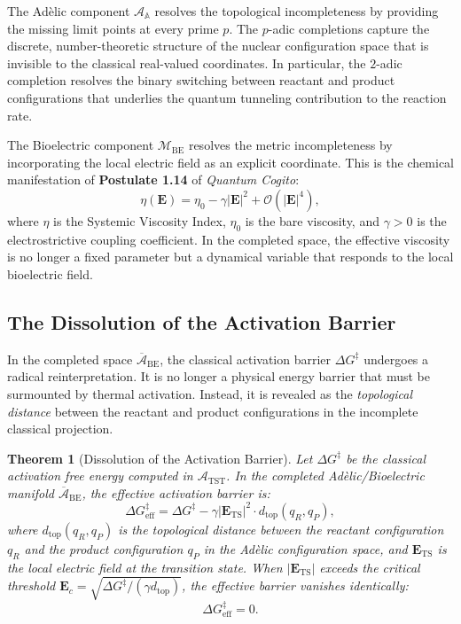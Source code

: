 \documentclass[11pt,openany]{extbook}
\theoremstyle{plain}
\newtheorem{theorem}{Theorem}[chapter]
\theoremstyle{definition}
\begin{document}
\noindent The Adèlic component $\mathcal{A}_{\mathbb{A}}$ resolves the topological incompleteness by providing the missing limit points at every prime $p$. The $p$-adic completions capture the discrete, number-theoretic structure of the nuclear configuration space that is invisible to the classical real-valued coordinates. In particular, the $2$-adic completion resolves the binary switching between reactant and product configurations that underlies the quantum tunneling contribution to the reaction rate.

\noindent The Bioelectric component $\mathcal{M}_{\mathrm{BE}}$ resolves the metric incompleteness by incorporating the local electric field as an explicit coordinate. This is the chemical manifestation of \textbf{Postulate 1.14} of \emph{Quantum Cogito}:
\[
\eta(\mathbf{E}) = \eta_0 - \gamma|\mathbf{E}|^2 + \mathcal{O}(|\mathbf{E}|^4),
\]
where $\eta$ is the Systemic Viscosity Index, $\eta_0$ is the bare viscosity, and $\gamma > 0$ is the electrostrictive coupling coefficient. In the completed space, the effective viscosity is no longer a fixed parameter but a dynamical variable that responds to the local bioelectric field.

\subsection{The Dissolution of the Activation Barrier}

\noindent In the completed space $\overline{\mathcal{A}}_{\mathrm{BE}}$, the classical activation barrier $\Delta G^{\ddagger}$ undergoes a radical reinterpretation. It is no longer a physical energy barrier that must be surmounted by thermal activation. Instead, it is revealed as the \emph{topological distance} between the reactant and product configurations in the incomplete classical projection.

\begin{theorem}[Dissolution of the Activation Barrier]
\label{thm:barrier-dissolution}
Let $\Delta G^{\ddagger}$ be the classical activation free energy computed in $\mathcal{A}_{\mathrm{TST}}$. In the completed Adèlic/Bioelectric manifold $\overline{\mathcal{A}}_{\mathrm{BE}}$, the effective activation barrier is:
\[
\Delta G^{\ddagger}_{\mathrm{eff}} = \Delta G^{\ddagger} - \gamma|\mathbf{E}_{\mathrm{TS}}|^2 \cdot d_{\mathrm{top}}(q_R, q_P),
\]
where $d_{\mathrm{top}}(q_R, q_P)$ is the topological distance between the reactant configuration $q_R$ and the product configuration $q_P$ in the Adèlic configuration space, and $\mathbf{E}_{\mathrm{TS}}$ is the local electric field at the transition state. When $|\mathbf{E}_{\mathrm{TS}}|$ exceeds the critical threshold $\mathbf{E}_c = \sqrt{\Delta G^{\ddagger} / (\gamma d_{\mathrm{top}})}$, the effective barrier vanishes identically:
\[
\Delta G^{\ddagger}_{\mathrm{eff}} = 0.
\]
\end{theorem}
\end{document}
